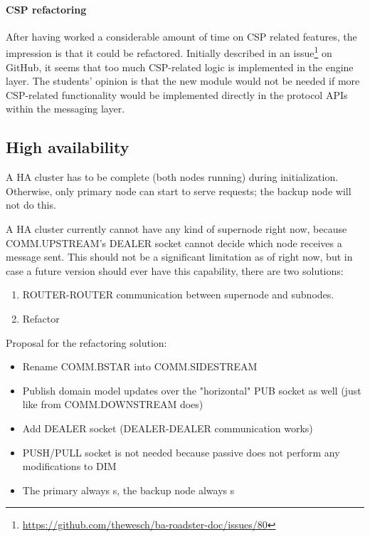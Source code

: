 \paragraph{CSP refactoring}
After having worked a considerable amount of time on \gls{CSP} related
features, the impression is that it could be refactored. Initially described in
an issue\footnote{\url{https://github.com/thewesch/ba-roadster-doc/issues/80}}
on GitHub, it seems that too much CSP-related logic is implemented in the
engine layer. The students' opinion is that the new module
 would not be needed if more CSP-related
functionality would be implemented directly in the protocol APIs within the
messaging layer.

\subsection{High availability}\label{sec:disc:ha}
A HA cluster has to be complete (both nodes running) during initialization.
Otherwise, only primary node can start to serve requests; the backup node will not
do this.


A HA cluster currently cannot have any kind of supernode right now, because
COMM.UPSTREAM's DEALER socket cannot decide which node receives a message sent.
This should not be a significant limitation as of right now, but in case a
future version should ever have this capability, there are two solutions:

\begin{enumerate}
	\item ROUTER-ROUTER communication between supernode and subnodes.
	\item Refactor
\end{enumerate}

Proposal for the refactoring solution:
\begin{itemize}
\item Rename COMM.BSTAR into COMM.SIDESTREAM
\item Publish domain model updates over the "horizontal" PUB socket as well (just like from COMM.DOWNSTREAM does)
\item Add DEALER socket (DEALER-DEALER communication works)
\item PUSH/PULL socket is not needed because passive does not perform any modifications to DIM
\item The primary always s, the backup node always s
\end{itemize}


